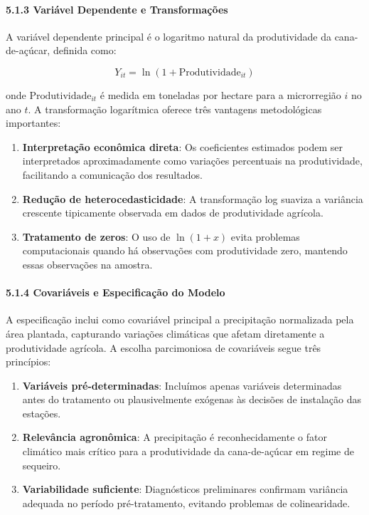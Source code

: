 \documentclass[
  brazilian,
  12pt,
  a4paper,
]{article}
\begin{document}
\paragraph{\texorpdfstring{\textbf{5.1.3 Variável Dependente e
Transformações}}{5.1.3 Variável Dependente e Transformações}}\label{variuxe1vel-dependente-e-transformauxe7uxf5es}

A variável dependente principal é o logaritmo natural da produtividade
da cana-de-açúcar, definida como:

\[Y_{it} = \ln(1 + \text{Produtividade}_{it})\]

onde \(\text{Produtividade}_{it}\) é medida em toneladas por hectare
para a microrregião \(i\) no ano \(t\). A transformação logarítmica
oferece três vantagens metodológicas importantes:

\begin{enumerate}
\def\labelenumi{\arabic{enumi}.}
\item
  \textbf{Interpretação econômica direta}: Os coeficientes estimados
  podem ser interpretados aproximadamente como variações percentuais na
  produtividade, facilitando a comunicação dos resultados.
\item
  \textbf{Redução de heterocedasticidade}: A transformação log suaviza a
  variância crescente tipicamente observada em dados de produtividade
  agrícola.
\item
  \textbf{Tratamento de zeros}: O uso de \(\ln(1+x)\) evita problemas
  computacionais quando há observações com produtividade zero, mantendo
  essas observações na amostra.
\end{enumerate}

\paragraph{\texorpdfstring{\textbf{5.1.4 Covariáveis e Especificação do
Modelo}}{5.1.4 Covariáveis e Especificação do Modelo}}\label{covariuxe1veis-e-especificauxe7uxe3o-do-modelo}

A especificação inclui como covariável principal a precipitação
normalizada pela área plantada, capturando variações climáticas que
afetam diretamente a produtividade agrícola. A escolha parcimoniosa de
covariáveis segue três princípios:

\begin{enumerate}
\def\labelenumi{\arabic{enumi}.}
\item
  \textbf{Variáveis pré-determinadas}: Incluímos apenas variáveis
  determinadas antes do tratamento ou plausivelmente exógenas às
  decisões de instalação das estações.
\item
  \textbf{Relevância agronômica}: A precipitação é reconhecidamente o
  fator climático mais crítico para a produtividade da cana-de-açúcar em
  regime de sequeiro.
\item
  \textbf{Variabilidade suficiente}: Diagnósticos preliminares confirmam
  variância adequada no período pré-tratamento, evitando problemas de
  colinearidade.
\end{enumerate}
\end{document}

